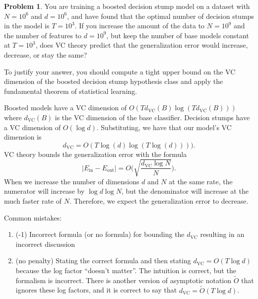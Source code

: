 \documentclass[10pt]{exam}
\theoremstyle{definition}
\newtheorem{problem}{Problem}
\newcommand{\Ein}{E_{\text{in}}}
\newcommand{\Eout}{E_{\text{out}}}
\newcommand{\dvc}{{d_{\text{VC}}}}
\begin{document}
\newpage
\begin{problem}
    You are training a boosted decision stump model on a dataset with $N=10^6$ and $d=10^6$,
    and have found that the optimal number of decision stumps in the model is $T=10^3$.
    If you increase the amount of the data to $N=10^9$ and the number of features to $d=10^9$, but keep the number of base models constant at $T=10^3$, does VC theory predict that the generalization error would increase, decrease, or stay the same?

    To justify your answer, you should compute a tight upper bound on the VC dimension of the boosted decision stump hypothesis class and apply the fundamental theorem of statistical learning.
\end{problem}
\begin{solution}
    Boosted models have a VC dimension of $O(T \dvc(B) \log (T \dvc(B)))$ where $\dvc(B)$ is the VC dimension of the base classifier.
    Decision stumps have a VC dimension of $O(\log d)$.
    Substituting, we have that our model's VC dimension is
    \begin{equation}
        \dvc = O(T \log(d) \log (T \log (d))))
        .
    \end{equation}
    VC theory bounds the generalization error with the formula
    \begin{equation}
        |\Ein-\Eout| = O\bigg(\sqrt{\frac{\dvc \log N}{N}}\bigg).
    \end{equation}
    When we increase the number of dimensions $d$ and $N$ at the same rate,
    the numerator will increase by $\log d \log N$, but the denominator will increase at the much faster rate of $N$.
    Therefore, we expect the generalization error to decrease.

    \vspace{0.2in}
    \noindent
    Common mistakes:
    \begin{enumerate}
        \item (-1) Incorrect formula (or no formula) for bounding the $\dvc$ resulting in an incorrect discussion
        \item (no penalty) Stating the correct formula and then stating $\dvc = O(T\log d)$ because the log factor ``doesn't matter''.
            The intuition is correct, but the formalism is incorrect.
            There is another version of asymptotic notation $\tilde O$ that ignores these log factors, and it is correct to say that $\dvc = \tilde O(T \log d)$.
    \end{enumerate}
\end{solution}
\end{document}
